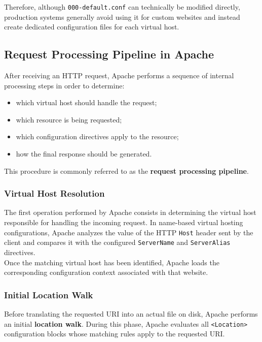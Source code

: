 \documentclass{scrbook}
\begin{document}
	Therefore, although \texttt{000-default.conf} can technically be modified directly, production systems generally avoid using it for custom websites and instead create dedicated configuration files for each virtual host.
	
	\subsection{Request Processing Pipeline in Apache}
	
	After receiving an HTTP request, Apache performs a sequence of internal processing steps in order to determine:
	\begin{itemize}
		\item
		which virtual host should handle the request;
		
		\item
		which resource is being requested;
		
		\item
		which configuration directives apply to the resource;
		
		\item
		how the final response should be generated.
	\end{itemize}
	
	This procedure is commonly referred to as the \textbf{request processing pipeline}.
	
	\subsubsection{Virtual Host Resolution}
	
	The first operation performed by Apache consists in determining the virtual host responsible for handling the incoming request. In name-based virtual hosting configurations, Apache analyzes the value of the HTTP \texttt{Host} header sent by the client and compares it with the configured \texttt{ServerName} and \texttt{ServerAlias} directives.\\
	
	Once the matching virtual host has been identified, Apache loads the corresponding configuration context associated with that website.
	
	\subsubsection{Initial Location Walk}
	
	Before translating the requested URI into an actual file on disk, Apache performs an initial \textbf{location walk}. During this phase, Apache evaluates all \texttt{<Location>} configuration blocks whose matching rules apply to the requested URI.\\
	
\end{document}
